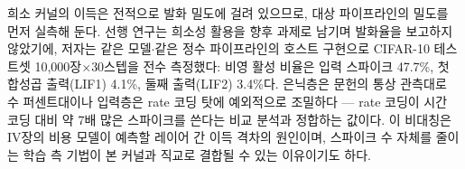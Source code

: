 희소 커널의 이득은 전적으로 발화 밀도에 걸려 있으므로, 대상
파이프라인의 밀도를 먼저 실측해 둔다. 선행
연구\cite{cha2026fusion}는 희소성 활용을 향후 과제로 남기며 발화율을
보고하지 않았기에, 저자는 같은 모델$\cdot$같은 정수 파이프라인의
호스트 구현으로 CIFAR-10 테스트셋 10{,}000장$\times$30스텝을 전수
측정했다: 비영 활성 비율은 입력 스파이크 47.7\%, 첫 합성곱
출력(LIF1) 4.1\%, 둘째 출력(LIF2) 3.4\%다. 은닉층은 문헌의 통상
관측대로 수 퍼센트대이나 입력층은 rate 코딩 탓에 예외적으로
조밀하다 --- rate 코딩이 시간 코딩 대비 약 7배 많은 스파이크를
쓴다는 비교 분석\cite{guo2021neural}과 정합하는 값이다. 이 비대칭은
IV장의 비용 모델이 예측할 레이어 간 이득 격차의 원인이며, 스파이크
수 자체를 줄이는 학습 측 기법\cite{sorbaro2020optimizing}이 본
커널과 직교로 결합될 수 있는 이유이기도 하다.
